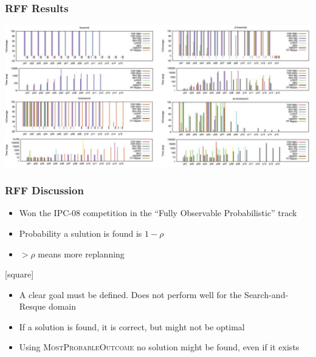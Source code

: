 \documentclass{beamer}
\let\origframetitle=\frametitle
\renewcommand\frametitle[1]{\origframetitle{\textbf{\large{\textrm{#1}}}}}
\begin{document}
\begin{frame}
  \frametitle{RFF Results}

  \includegraphics[width=\textwidth]{images/rff-results.pdf}
\end{frame}

\begin{frame}
  \frametitle{RFF Discussion}

  \begin{itemize}
    \item Won the IPC-08 competition in the ``Fully Observable Probabilistic'' track
    \item Probability a sulution is found is $1 - \rho$
    \item $> \rho$ means more replanning
  \end{itemize}

  [square]
  \begin{itemize}
    \item A clear goal must be defined. Does not perform well for the Search-and-Resque domain
    \item If a solution is found, it is correct, but might not be optimal
    \item Using \textsc{MostProbableOutcome} no solution might be found, even if it exists
  \end{itemize}

\end{frame}
\end{document}
